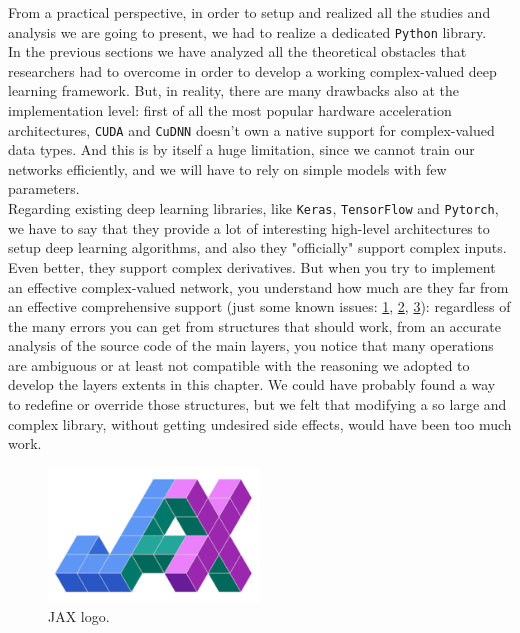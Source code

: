 \documentclass[../main.tex]{subfiles}
\begin{document}
From a practical perspective, in order to setup and realized all the studies and analysis we are going to present, we had to realize a dedicated \texttt{Python} library.\\
In the previous sections we have analyzed all the theoretical obstacles that researchers had to overcome in order to develop a working complex-valued deep learning framework. But, in reality, there are many drawbacks also at the implementation level: first of all the most popular hardware acceleration architectures, \texttt{CUDA} and \texttt{CuDNN} doesn't own a native support for complex-valued data types. And this is by itself a huge limitation, since we cannot train our networks efficiently, and we will have to rely on simple models with few parameters.\\
Regarding existing deep learning libraries, like \texttt{Keras}, \texttt{TensorFlow} and \texttt{Pytorch}, we have to say that they provide a lot of interesting high-level architectures to setup deep learning algorithms, and also they "officially" support complex inputs. Even better, they support complex derivatives. But when you try to implement an effective complex-valued network, you understand how much are they far from an effective comprehensive support (just some known issues: \href{https://github.com/pytorch/pytorch/issues/33152}{1}, \href{https://github.com/tensorflow/tensorflow/issues/17097}{2}, \href{https://github.com/microsoft/tensorflow-directml/issues/32}{3}): regardless of the many errors you can get from structures that should work, from an accurate analysis of the source code of the main layers, you notice that many operations are ambiguous or at least not compatible with the reasoning we adopted to develop the layers extents in this chapter. We could have probably found a way to redefine or override those structures, but we felt that modifying a so large and complex library, without getting undesired side effects, would have been too much work.
\begin{figure}
	\includegraphics[width=0.5\textwidth]{pictures/JAX_logo.pdf}
	\caption{JAX logo.}
\end{figure}
\end{document}
